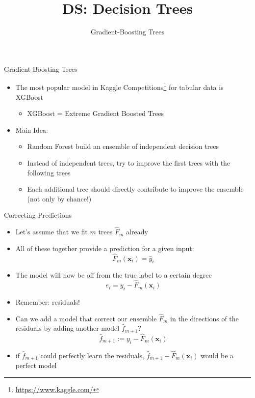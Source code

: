 \documentclass[aspectratio=169]{../latex_main/tntbeamer}  %
\title[Gradient-Boosting Trees]{DS: Decision Trees}
\subtitle{Gradient-Boosting Trees}
\begin{document}
	
	\maketitle
	\begin{frame}[c]{Gradient-Boosting Trees}

    \begin{itemize}
        \item The most popular model in Kaggle Competitions\footnote{\url{https://www.kaggle.com/}} for tabular data is XGBoost
        \begin{itemize}
            \item XGBoost = Extreme Gradient Boosted Trees
        \end{itemize}
        \smallskip
        \item Main Idea:
        \begin{itemize}
            \item Random Forest build an ensemble of independent decision trees
            \item Instead of independent trees, try to improve the first trees with the following trees
            \item Each additional tree should directly contribute to improve the ensemble (not only by chance!)
        \end{itemize}
    \end{itemize}

	\end{frame}
	
	\begin{frame}[c]{Correcting Predictions}

    \vspace{-1em}
    \begin{itemize}
        \item Let's assume that we fit $m$ trees $\hat{F}_m$ already
        \item All of these together provide a prediction for a given input:
        $$ \hat{F}_m(\bm{x}_i) = \hat{y}_i $$
        \smallskip
        \item The model will now be off from the true label to a certain degree
        $$e_i = y_i - \hat{F}_m(\bm{x}_i)$$
        \item Remember: residuals!
        \smallskip
        \item Can we add a model that correct our ensemble $\hat{F}_m$ in the directions of the residuals by adding another model $\hat{f}_{m+1}$?
        $$ \hat{f}_{m+1} :=  y_i - \hat{F}_m(\bm{x}_i)$$ 
        \item if $ \hat{f}_{m+1}$ could perfectly learn the residuals, $\hat{f}_{m+1} +  \hat{F}_m(\bm{x}_i)$ would be a perfect model
    \end{itemize}

	\end{frame}
	
\end{document}
